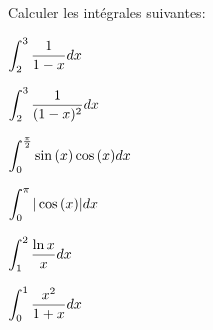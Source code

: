 \documentclass[a4paper, 11pt,reqno]{article}
\begin{document}
\begin{exercice}   \;
	Calculer les int\'egrales suivantes:
	\begin{enumerate}
		\begin{minipage}[t]{0.3\textwidth}
			\item $\displaystyle \int_{2}^{3} \displaystyle\frac{1}{1-x} dx$\vsec
			\item $\displaystyle \int_{2}^{3} \displaystyle\frac{1}{(1-x)^2} dx$
		\end{minipage}
		\begin{minipage}[t]{0.3\textwidth}
			\item $\displaystyle \int_{0}^{\frac{\pi}{2}} \sin{(x)}\cos{(x)} dx$\vsec
			\item $\displaystyle \int_{0}^{\pi} |\cos{(x)}| dx$
		\end{minipage}
		\begin{minipage}[t]{0.3\textwidth}
			\item $\displaystyle \int_{1}^{2} \displaystyle\frac{\ln{x}}{x} dx$\vsec
			\item $\displaystyle \int_{0}^{1} \displaystyle\frac{x^2}{1+x} dx$
		\end{minipage}
	\end{enumerate}
\end{exercice}
\end{document}
